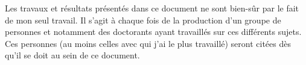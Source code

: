 Les travaux et r\'esultats pr\'esent\'es dans ce document ne sont bien-s\^ur par le fait de mon seul travail. Il s'agit \`a chaque fois de la production d'un groupe de personnes et notamment des doctorants ayant travaill\'es sur ces diff\'erents sujets. Ces personnes (au moins celles avec qui j'ai le plus travaill\'e) seront cit\'ees d\`es qu'il se doit au sein de ce document.

